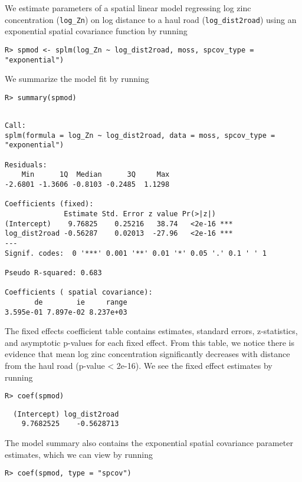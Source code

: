 \documentclass[10pt,letterpaper]{article}
\begin{document}
We estimate parameters of a spatial linear model regressing log zinc
concentration (\texttt{log\_Zn}) on log distance to a haul road
(\texttt{log\_dist2road}) using an exponential spatial covariance
function by running

\begin{verbatim}
R> spmod <- splm(log_Zn ~ log_dist2road, moss, spcov_type = "exponential")
\end{verbatim}

We summarize the model fit by running

\begin{verbatim}
R> summary(spmod)
\end{verbatim}

\begin{verbatim}

Call:
splm(formula = log_Zn ~ log_dist2road, data = moss, spcov_type = "exponential")

Residuals:
    Min      1Q  Median      3Q     Max 
-2.6801 -1.3606 -0.8103 -0.2485  1.1298 

Coefficients (fixed):
              Estimate Std. Error z value Pr(>|z|)    
(Intercept)    9.76825    0.25216   38.74   <2e-16 ***
log_dist2road -0.56287    0.02013  -27.96   <2e-16 ***
---
Signif. codes:  0 '***' 0.001 '**' 0.01 '*' 0.05 '.' 0.1 ' ' 1

Pseudo R-squared: 0.683

Coefficients ( spatial covariance):
       de        ie     range 
3.595e-01 7.897e-02 8.237e+03 
\end{verbatim}

The fixed effects coefficient table contains estimates, standard errors,
z-statistics, and asymptotic p-values for each fixed effect. From this
table, we notice there is evidence that mean log zinc concentration
significantly decreases with distance from the haul road (p-value
\textless{} 2e-16). We see the fixed effect estimates by running

\begin{verbatim}
R> coef(spmod)
\end{verbatim}

\begin{verbatim}
  (Intercept) log_dist2road 
    9.7682525    -0.5628713 
\end{verbatim}

The model summary also contains the exponential spatial covariance
parameter estimates, which we can view by running

\begin{verbatim}
R> coef(spmod, type = "spcov")
\end{verbatim}
\end{document}
